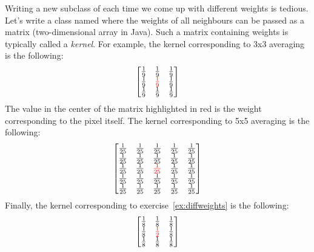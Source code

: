 \documentclass{book}
\begin{document}
Writing a new subclass of  each time we come up with different weights is tedious. Let's write a class named  where the weights of all neighbours can be passed as a matrix (two-dimensional array in Java). Such a matrix containing weights is typically called a \emph{kernel}. For example, the kernel corresponding to 3x3 averaging is the following:
$$
 \begin{bmatrix}
  \frac{1}{9} & \frac{1}{9} & \frac{1}{9} \\
  \frac{1}{9} & \textcolor{red}{\frac{1}{9}} & \frac{1}{9} \\
  \frac{1}{9} & \frac{1}{9} & \frac{1}{9}
 \end{bmatrix}
$$
The value in the center of the matrix highlighted in red is the weight corresponding to the pixel itself. The kernel corresponding to 5x5 averaging is the following:
$$
 \begin{bmatrix}
  \frac{1}{25} & \frac{1}{25} & \frac{1}{25} & \frac{1}{25} & \frac{1}{25}\\
  \frac{1}{25} & \frac{1}{25} & \frac{1}{25} & \frac{1}{25} & \frac{1}{25}\\
  \frac{1}{25} & \frac{1}{25} & \textcolor{red}{\frac{1}{25}} & \frac{1}{25} & \frac{1}{25}\\
  \frac{1}{25} & \frac{1}{25} & \frac{1}{25} & \frac{1}{25} & \frac{1}{25}\\
  \frac{1}{25} & \frac{1}{25} & \frac{1}{25} & \frac{1}{25} & \frac{1}{25}
 \end{bmatrix}
$$
Finally, the kernel corresponding to exercise~\ref{ex:diffweights} is the following:
$$
 \begin{bmatrix}
  \frac{1}{8} & \frac{1}{8} & \frac{1}{8} \\
  \frac{1}{8} & \textcolor{red}{\frac{1}{2}} & \frac{1}{8} \\
  \frac{1}{8} & \frac{1}{8} & \frac{1}{8}
 \end{bmatrix}
$$
\end{document}
